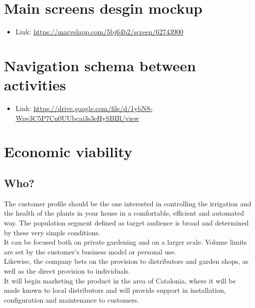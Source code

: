 \documentclass[11pt,a4paper]{article}
\begin{document}
\newpage


\section{Main screens desgin mockup}
\begin{itemize}
\item Link: \url{https://marvelapp.com/5bj64b2/screen/62743900}
\end{itemize}

\section{Navigation schema between activities}
\begin{itemize}
\item Link: \url{https://drive.google.com/file/d/1ybN8-Wpv3C5P7Cu0UUbcai3s3eHySBIR/view}
\end{itemize}

\section{Economic viability}
\subsection{Who?}
The customer profile should be the one interested in controlling the irrigation and the health of the plants in your house in a comfortable, efficient and automated way. The population segment defined as target audience is broad and determined by these very simple conditions. \\

It can be focused both on private gardening and on a larger scale. Volume limits are set by the customer's business model or personal use. \\

Likewise, the company bets on the provision to distributors and garden shops, as well as the direct provision to individuals.\\

It will begin marketing the product in the area of Catalonia, where it will be made known to local distributors and will provide support in installation, configuration and maintenance to customers. 
\end{document}
